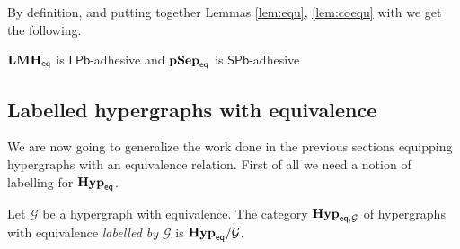 \documentclass[3p]{elsarticle}
\newcommand{\pbl}{\mathsf{LPb}}
\newcommand{\pbs}{\mathsf{SPb}}
\newcommand{\catname}[1]{\textbf{\textup{#1}}}
\newcommand{\EqHyp}{\catname{Hyp}_{\mathsf{eq}}} %
\newcommand{\EqpsHyp}{\catname{pSep}_{\mathsf{eq}}}
\newcommand{\Eqlmo}{\catname{LMH}_{\mathsf{eq}}}
\newcommand{\EqHyps}{\catname{Hyp}_{\mathsf{eq}, \mathcal{G}}}
\theoremstyle{remark}
\theoremstyle{definition}
\begin{document}
By definition,  and putting together Lemmas \ref{lem:equ}, \ref{lem:coequ} with  we get the following.

\begin{cor}$\Eqlmo$ is $\pbl$-adhesive and $\EqpsHyp$ is $\pbs$-adhesive
\end{cor}



\subsection{Labelled hypergraphs with equivalence}

We are now going to generalize the work done in the previous sections equipping hypergraphs with an equivalence relation. First of all we need a notion of labelling for $\EqHyp$. 

\begin{defi}
	Let $\mathcal{G}$ be a hypergraph with equivalence. The category $\EqHyps$ of hypergraphs with equivalence \emph{labelled by $\mathcal{G}$}  is $\EqHyp/\mathcal{G}$.
\end{defi}
\end{document}
